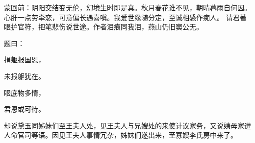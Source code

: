 
\begin{parag}
    \begin{note}蒙回前：阴阳交结变无伦，幻境生时即是真。秋月春花谁不见，朝晴暮雨自何因。心肝一点劳牵恋，可意偏长遇喜嗔。我爱世缘随分定，至诚相感作痴人。
        请君著眼护官符，把笔悲伤说世途。作者泪痕同我泪，燕山仍旧窦公无。\end{note}
\end{parag}


\begin{parag}
    题曰：
\end{parag}


\begin{poem}
    \begin{pl}捐躯报国恩，\end{pl}
    \begin{pl}未报躯犹在。\end{pl}

    \begin{pl}眼底物多情，\end{pl}
    \begin{pl}君恩或可待。\end{pl}
\end{poem}


\begin{parag}
    却说黛玉同姊妹们至王夫人处，见王夫人与兄嫂处的来使计议家务，又说姨母家遭人命官司等语。因见王夫人事情冗杂，姊妹们遂出来，至寡嫂李氏房中来了。
\end{parag}


